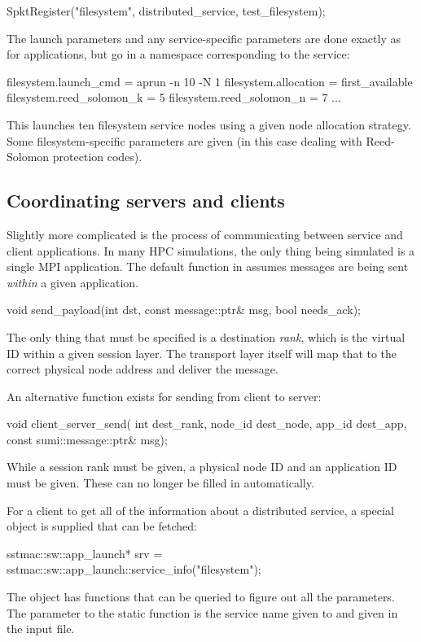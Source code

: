 \begin{CppCode}
SpktRegister("filesystem", distributed_service, test_filesystem);
\end{CppCode}
The launch parameters and any service-specific parameters are done exactly as for applications, but go in a namespace corresponding to the service:

\begin{ViFile}
filesystem.launch_cmd = aprun -n 10 -N 1
filesystem.allocation = first_available
filesystem.reed_solomon_k = 5
filesystem.reed_solomon_n = 7
...
\end{ViFile}
This launches ten filesystem service nodes using a given node allocation strategy.
Some filesystem-specific parameters are given (in this case dealing with Reed-Solomon protection codes).

\subsection{Coordinating servers and clients}
\label{subsec:coordinatingServersClients}
Slightly more complicated is the process of communicating between service and client applications.
In many HPC simulations, the only thing being simulated is a single MPI application.
The default  function in  assumes messages are being sent \emph{within} a given application.

\begin{CppCode}
void
send_payload(int dst, 
  const message::ptr& msg, 
  bool needs_ack);
\end{CppCode}
The only thing that must be specified is a destination \emph{rank}, which is the virtual ID within a given session layer.
The transport layer itself will map that to the correct physical node address and deliver the message.

An alternative function exists for sending from client to server:

\begin{CppCode}
void client_server_send(
  int dest_rank,
  node_id dest_node,
  app_id dest_app,
  const sumi::message::ptr& msg);
\end{CppCode}
While a session rank must be given, a physical node ID and an application ID must be given.
These can no longer be filled in automatically.

For a client to get all of the information about a distributed service, a special object is supplied that can be fetched:

\begin{CppCode}
sstmac::sw::app_launch* srv = sstmac::sw::app_launch::service_info("filesystem");
\end{CppCode}
The object  has functions that can be queried to figure out all the  parameters.  
The parameter to the static  function is the service name given to  and given in the input file.

